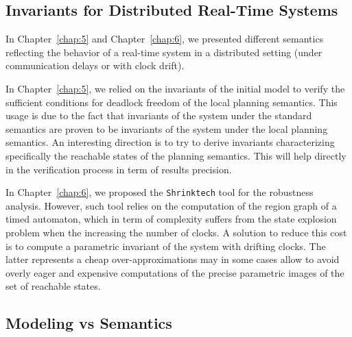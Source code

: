 \subsection*{Invariants for Distributed Real-Time Systems}

In Chapter~\ref{chap:5} and Chapter~\ref{chap:6}, we presented different semantics reflecting
the behavior of a real-time system in a distributed setting (under communication delays or 
with clock drift). 

In Chapter~\ref{chap:5}, we relied on the invariants of the initial model
to verify the sufficient conditions for deadlock freedom of the local planning semantics.
This usage is due to the fact that invariants of the system under the standard semantics 
are proven to be invariants of the system under the local planning semantics.
An interesting direction is to try to derive invariants characterizing specifically the reachable
states of the planning semantics. This will help directly in the verification process in term of 
results precision.

In Chapter~\ref{chap:6}, we proposed the \texttt{Shrinktech} tool for the robustness analysis.
However, such tool relies on the computation of the region graph of a timed automaton, which
in term of complexity suffers from the state explosion problem when the increasing the number of
clocks. A solution to reduce this cost is to compute a parametric invariant of the system
with drifting clocks. The latter represents a cheap over-approximations may in some cases 
allow to avoid overly eager and expensive computations of the precise parametric images of 
the set of reachable states. 

\subsection*{Modeling vs Semantics}

